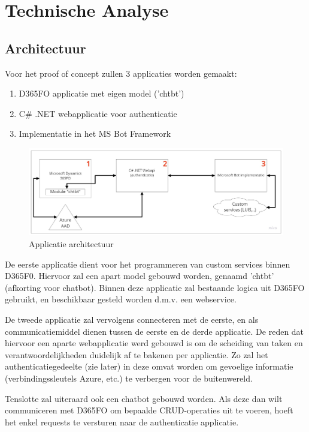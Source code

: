 \chapter{Technische Analyse}
\label{ch:technischeanalyse}

\section{Architectuur}
Voor het proof of concept zullen 3 applicaties worden gemaakt:
\begin{enumerate}
    \item D365FO applicatie met eigen model ('chtbt')
    \item C\# .NET webapplicatie voor authenticatie
    \item Implementatie in het MS Bot Framework
\end{enumerate}
\begin{figure}[h]
    \centering
    \includegraphics[width=1\textwidth]{img/ApplicatieArchitectuur}
    \caption{Applicatie architectuur}
\end{figure}
De eerste applicatie dient voor het programmeren van custom services binnen D365F0. Hiervoor zal een apart model gebouwd worden, genaamd 'chtbt' (afkorting voor chatbot). Binnen deze applicatie zal bestaande logica uit D365FO gebruikt, en beschikbaar gesteld worden d.m.v. een webservice. 

De tweede applicatie zal vervolgens connecteren met de eerste, en als communicatiemiddel dienen tussen de eerste en de derde applicatie. De reden dat hiervoor een aparte webapplicatie werd gebouwd is om de scheiding van taken en verantwoordelijkheden duidelijk af te bakenen per applicatie. Zo zal het authenticatiegedeelte (zie later) in deze omvat worden om gevoelige informatie (verbindingssleutels Azure, etc.) te verbergen voor de buitenwereld. 

Tenslotte zal uiteraard ook een chatbot gebouwd worden. Als deze dan wilt communiceren met D365FO om bepaalde CRUD-operaties uit te voeren, hoeft het enkel requests te versturen naar de authenticatie applicatie.

